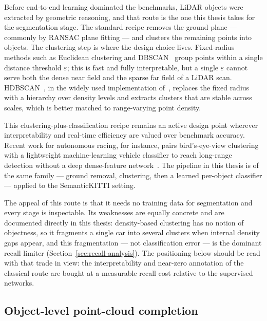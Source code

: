 Before end-to-end learning dominated the benchmarks, LiDAR objects were extracted by
geometric reasoning, and that route is the one this thesis takes for the segmentation
stage. The standard recipe removes the ground plane --- commonly by RANSAC plane
fitting --- and clusters the remaining points into objects. The clustering step is
where the design choice lives. Fixed-radius methods such as Euclidean clustering and
DBSCAN~\cite{ester1996dbscan} group points within a single distance threshold
$\varepsilon$; this is fast and fully interpretable, but a single $\varepsilon$ cannot
serve both the dense near field and the sparse far field of a LiDAR scan.
HDBSCAN~\cite{campello2013hdbscan}, in the widely used implementation
of~\cite{mcinnes2017hdbscan}, replaces the fixed radius with a hierarchy over density
levels and extracts clusters that are stable across scales, which is better matched to
range-varying point density.

This clustering-plus-classification recipe remains an active design point wherever
interpretability and real-time efficiency are valued over benchmark accuracy. Recent
work for autonomous racing, for instance, pairs bird's-eye-view clustering with a
lightweight machine-learning vehicle classifier to reach long-range detection without a
deep dense-feature network~\cite{lim2025longrange}. The pipeline in this thesis is of
the same family --- ground removal, clustering, then a learned per-object classifier ---
applied to the SemanticKITTI setting.

The appeal of this route is that it needs no training data for segmentation and every
stage is inspectable. Its weaknesses are equally concrete and are documented directly in
this thesis: density-based clustering has no notion of objectness, so it fragments a
single car into several clusters when internal density gaps appear, and this
fragmentation --- not classification error --- is the dominant recall limiter
(Section~\ref{sec:recall-analysis}). The positioning below should be read with that trade in view: the
interpretability and near-zero annotation of the classical route are bought at a
measurable recall cost relative to the supervised networks.

\subsection{Object-level point-cloud completion}
\label{sec:bg-completion}


